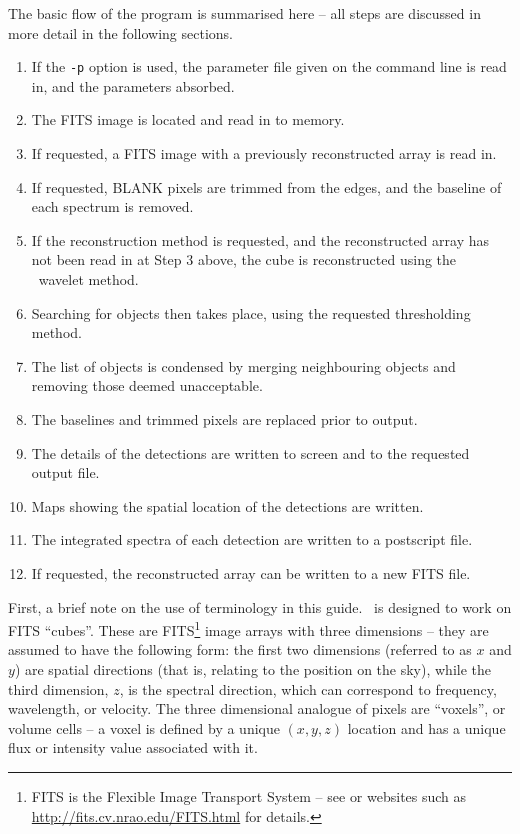 The basic flow of the program is summarised here -- all steps are
discussed in more detail in the following sections.
\begin{enumerate}
\item If the \texttt{-p} option is used, the parameter file given on
  the command line is read in, and the parameters absorbed.
\item The FITS image is located and read in to memory.
\item If requested, a FITS image with a previously reconstructed array
  is read in.
\item If requested, BLANK pixels are trimmed from the edges, and
  the baseline of each spectrum is removed.
\item If the reconstruction method is requested, and the reconstructed
  array has not been read in at Step 3 above, the cube is
  reconstructed using the \atrous\ wavelet method.
\item Searching for objects then takes place, using the requested
  thresholding method.
\item The list of objects is condensed by merging neighbouring objects
  and removing those deemed unacceptable.
\item The baselines and trimmed pixels are replaced prior to output.
\item The details of the detections are written to screen and to the
  requested output file.
\item Maps showing the spatial location of the detections are written.
\item The integrated spectra of each detection are written to a
  postscript file. 
\item If requested, the reconstructed array can be written to a new
  FITS file.
\end{enumerate}


First, a brief note on the use of terminology in this guide. \duchamp\
is designed to work on FITS ``cubes''. These are FITS\footnote{FITS is
the Flexible Image Transport System -- see \citet{hanisch01} or
websites such as
\href{http://fits.cv.nrao.edu/FITS.html}{http://fits.cv.nrao.edu/FITS.html}
for details.} image arrays with three dimensions -- they are assumed
to have the following form: the first two dimensions (referred to as
$x$ and $y$) are spatial directions (that is, relating to the position
on the sky), while the third dimension, $z$, is the spectral
direction, which can correspond to frequency, wavelength, or
velocity. The three dimensional analogue of pixels are ``voxels'', or
volume cells -- a voxel is defined by a unique $(x,y,z)$ location and
has a unique flux or intensity value associated with it.

